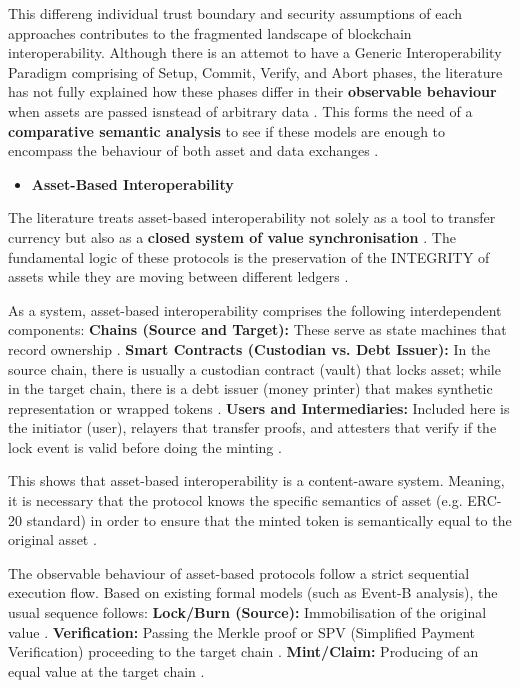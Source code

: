 This differeng individual trust boundary and security assumptions of
each approaches contributes to the fragmented landscape of blockchain
interoperability\citep{Belchior_2023}. Although there is an attemot to
have a Generic Interoperability Paradigm comprising of Setup, Commit,
Verify, and Abort phases, the literature has not fully explained how
these phases differ in their \textbf{observable behaviour} when assets
are passed isnstead of arbitrary data \citep{deng2025} \citep{Li2025}.
This forms the need of a \textbf{comparative semantic analysis} to see
if these models are enough to encompass the behaviour of both asset and
data exchanges \citep{Li2025}.

\begin{itemize}
\tightlist
\item
  \textbf{Asset-Based Interoperability}
\end{itemize}

The literature treats asset-based interoperability not solely as a tool
to transfer currency but also as a \textbf{closed system of value
synchronisation} \citep{Pillai_2022} \citep{Cheng_2024}. The fundamental
logic of these protocols is the preservation of the INTEGRITY of assets
while they are moving between different ledgers
\citep{Llambas2024patterns} \citep{Pillai_2022} \citep{Belchior_2023}.

As a system, asset-based interoperability comprises the following
interdependent components: \textbf{Chains (Source and Target):} These
serve as state machines that record ownership \citep{wang2021sok}
\citep{deng2025} \citep{Cheng_2024}. \textbf{Smart Contracts (Custodian
vs. Debt Issuer):} In the source chain, there is usually a custodian
contract (vault) that locks asset; while in the target chain, there is a
debt issuer (money printer) that makes synthetic representation or
wrapped tokens \citep{Notland_2026} \citep{soureshjani2026}.
\textbf{Users and Intermediaries:} Included here is the initiator
(user), relayers that transfer proofs, and attesters that verify if the
lock event is valid before doing the minting \citep{Notland_2026}
\citep{Llambas2025} \citep{Belchior_2023}.

This shows that asset-based interoperability is a content-aware system.
Meaning, it is necessary that the protocol knows the specific semantics
of asset (e.g. ERC-20 standard) in order to ensure that the minted token
is semantically equal to the original asset \citep{Llambas2025}
\citep{Pillai_2022} \citep{deng2025}.

The observable behaviour of asset-based protocols follow a strict
sequential execution flow. Based on existing formal models (such as
Event-B analysis), the usual sequence follows: \textbf{Lock/Burn
(Source):} Immobilisation of the original value \citep{Notland_2026}
\citep{Llambas2025} \citep{deng2025}. \textbf{Verification:} Passing the
Merkle proof or SPV (Simplified Payment Verification) proceeding to the
target chain \citep{wang2021sok} \citep{lu2024atomicity}
\citep{Bigiotti2025} \citep{deng2025}. \textbf{Mint/Claim:} Producing of
an equal value at the target chain \citep{Llambas2025}
\citep{Sober_2022} \citep{Li2025}.

